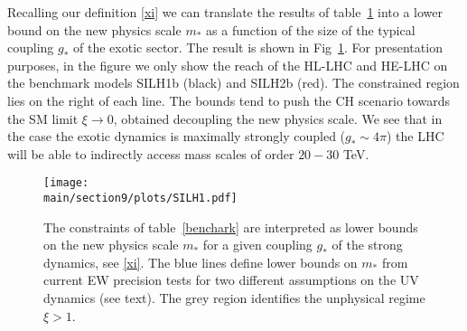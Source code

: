 %






Recalling our definition \eqref{xi} we can translate the results of table~\ref{SILH} into a lower bound on the new physics scale $m_*$ as a function of the size of the typical coupling $g_*$ of the exotic sector. The result is shown in Fig~\ref{SILH}. For presentation purposes, in the figure we only show the reach of the HL-LHC and HE-LHC on the benchmark models SILH1b (black) and SILH2b (red). The constrained region lies on the right of each line. The bounds tend to push the CH scenario towards the SM limit $\xi\to0$, obtained decoupling the new physics scale. We see that in the case the exotic dynamics is maximally strongly coupled ($g_*\sim4\pi$) the LHC will be able to indirectly access mass scales of order $20-30$ TeV.

\begin{figure}[t]
\begin{center}
\texttt{[image: \\main/section9/plots/SILH1.pdf]}
\caption{The constraints of table~\ref{benchark} are interpreted as lower bounds on the new physics scale $m_*$ for a given coupling $g_*$ of the strong dynamics, see \eqref{xi}. The blue lines define lower bounds on $m_*$ from current EW precision tests for two different assumptions on the UV dynamics (see text). The grey region identifies the unphysical regime $\xi>1$. 
}\label{SILH}
\end{center}
\end{figure}



